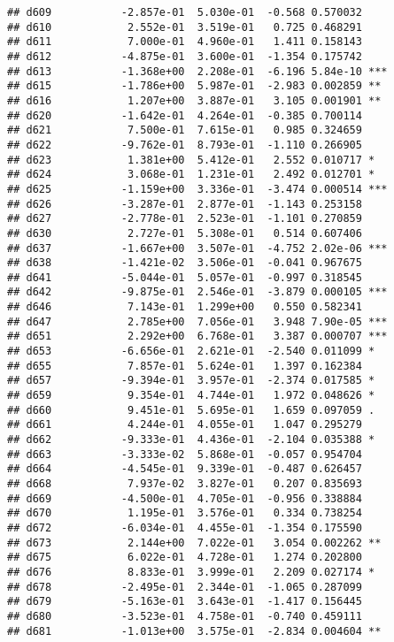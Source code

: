 \documentclass[
]{article}
\begin{document}
\begin{verbatim}
## d609           -2.857e-01  5.030e-01  -0.568 0.570032    
## d610            2.552e-01  3.519e-01   0.725 0.468291    
## d611            7.000e-01  4.960e-01   1.411 0.158143    
## d612           -4.875e-01  3.600e-01  -1.354 0.175742    
## d613           -1.368e+00  2.208e-01  -6.196 5.84e-10 ***
## d615           -1.786e+00  5.987e-01  -2.983 0.002859 ** 
## d616            1.207e+00  3.887e-01   3.105 0.001901 ** 
## d620           -1.642e-01  4.264e-01  -0.385 0.700114    
## d621            7.500e-01  7.615e-01   0.985 0.324659    
## d622           -9.762e-01  8.793e-01  -1.110 0.266905    
## d623            1.381e+00  5.412e-01   2.552 0.010717 *  
## d624            3.068e-01  1.231e-01   2.492 0.012701 *  
## d625           -1.159e+00  3.336e-01  -3.474 0.000514 ***
## d626           -3.287e-01  2.877e-01  -1.143 0.253158    
## d627           -2.778e-01  2.523e-01  -1.101 0.270859    
## d630            2.727e-01  5.308e-01   0.514 0.607406    
## d637           -1.667e+00  3.507e-01  -4.752 2.02e-06 ***
## d638           -1.421e-02  3.506e-01  -0.041 0.967675    
## d641           -5.044e-01  5.057e-01  -0.997 0.318545    
## d642           -9.875e-01  2.546e-01  -3.879 0.000105 ***
## d646            7.143e-01  1.299e+00   0.550 0.582341    
## d647            2.785e+00  7.056e-01   3.948 7.90e-05 ***
## d651            2.292e+00  6.768e-01   3.387 0.000707 ***
## d653           -6.656e-01  2.621e-01  -2.540 0.011099 *  
## d655            7.857e-01  5.624e-01   1.397 0.162384    
## d657           -9.394e-01  3.957e-01  -2.374 0.017585 *  
## d659            9.354e-01  4.744e-01   1.972 0.048626 *  
## d660            9.451e-01  5.695e-01   1.659 0.097059 .  
## d661            4.244e-01  4.055e-01   1.047 0.295279    
## d662           -9.333e-01  4.436e-01  -2.104 0.035388 *  
## d663           -3.333e-02  5.868e-01  -0.057 0.954704    
## d664           -4.545e-01  9.339e-01  -0.487 0.626457    
## d668            7.937e-02  3.827e-01   0.207 0.835693    
## d669           -4.500e-01  4.705e-01  -0.956 0.338884    
## d670            1.195e-01  3.576e-01   0.334 0.738254    
## d672           -6.034e-01  4.455e-01  -1.354 0.175590    
## d673            2.144e+00  7.022e-01   3.054 0.002262 ** 
## d675            6.022e-01  4.728e-01   1.274 0.202800    
## d676            8.833e-01  3.999e-01   2.209 0.027174 *  
## d678           -2.495e-01  2.344e-01  -1.065 0.287099    
## d679           -5.163e-01  3.643e-01  -1.417 0.156445    
## d680           -3.523e-01  4.758e-01  -0.740 0.459111    
## d681           -1.013e+00  3.575e-01  -2.834 0.004604 ** 

\end{verbatim}
\end{document}
